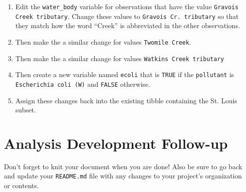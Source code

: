 \documentclass{tufte-handout}
\begin{document}
\begin{enumerate}
\begin{enumerate}
\item Edit the \texttt{water\_body} variable for observations that have the value \texttt{Gravois Creek tributary}. Change these values to \texttt{Gravois Cr. tributary} so that they match how the word ``Creek'' is abbreviated in the other observations.
\item Then make the a similar change for values \texttt{Twomile Creek}.
\item Then make the a similar change for values \texttt{Watkins Creek tributary}
\item Then create a new variable named \texttt{ecoli} that is \texttt{TRUE} if the \texttt{pollutant} is \texttt{Escherichia coli (W)} and \texttt{FALSE} otherwise.
\item Assign these changes back into the existing tibble containing the St. Louis subset.
\end{enumerate}
\end{enumerate}

\vspace{5mm}
\section{Analysis Development Follow-up}
Don't forget to knit your document when you are done! Also be sure to go back and update your \texttt{README.md} file with any changes to your project's organization or contents.

\end{document}
